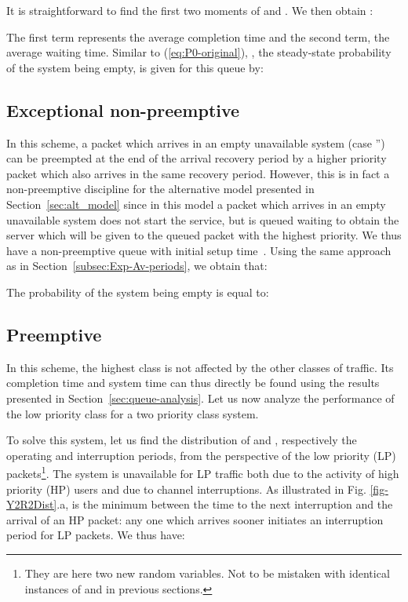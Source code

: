 \documentclass[11pt,journal,oneside,onecolumn,draftclsnofoot]{IEEEtran}
\begin{document}
It is straightforward to find the first two moments of  and . We then obtain \cite{takagi91}:

The first term represents the average completion time and the second term, the average waiting time. 
Similar to (\ref{eq:P0-original}), , the steady-state probability of the system being empty, is given for this queue by:


 
\subsection{{Exceptional non-preemptive}}
\label{sec:except_non_preempt}

In this scheme, a packet which arrives in an empty unavailable system (case '') can be preempted at the end of the arrival recovery period by a higher priority packet which also arrives in the same recovery period. However, this is in fact a non-preemptive discipline for the alternative model presented in Section~\ref{sec:alt_model} since in this model a packet which arrives in an empty unavailable system does not start the service, but is queued waiting to obtain the server which will be given to the queued packet with the highest priority.
We thus have a non-preemptive queue with initial setup time~\cite{takagi91}. Using the same approach as in Section~\ref{subsec:Exp-Av-periods}, we obtain that:

The probability of the system being empty is equal to: 


\subsection{{Preemptive}}
\label{sec:preempt}

In this scheme, the highest class is not affected by the other classes of traffic. Its completion time and system time can thus directly be found using the results presented in Section~\ref{sec:queue-analysis}. Let us now analyze the performance of the low priority class for a two priority class system.

To solve this system, let us find the distribution of  and , respectively the operating and interruption periods, from the perspective of the low priority (LP) packets\footnote{They are here two new random variables. Not to be mistaken with identical instances of  and  in previous sections.}. The system is unavailable for LP traffic both due to the activity of high priority (HP) users and due to channel interruptions. As illustrated in Fig. \ref{fig-Y2R2Dist}.a,  is the minimum between the time to the next interruption and the arrival of an HP packet: any one which arrives sooner initiates an interruption period for LP packets. We thus have:
\end{document}
